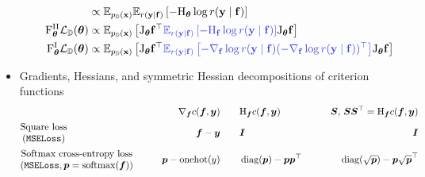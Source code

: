\begin{itemize}
\begin{itemize}
\begin{align*}
      &\propto
        \E_{p_{\sD}(\rvx)}
        \E_{r(\rvy \mid \rvf)}
        \left[
        -\hess_{\vtheta} \log r(\rvy \mid \rvf)
        \right]
      \\
      \fisher^{\text{II}}_{\vtheta} \gL_{\sD}(\vtheta)
      &\propto
        \E_{p_{\sD}(\rvx)}
        \left[
        \jac_{\vtheta} \rvf^{\top}
        \textcolor{VectorBlue}{
        \E_{r(\rvy \mid \rvf)}
        \left[
        -\hess_{\rvf} \log r(\rvy \mid \rvf)
        \right]
        }
        \jac_{\vtheta} \rvf
        \right]
      \\
      \fisher^{\text{I}}_{\vtheta} \gL_{\sD}(\vtheta)
      &\propto
        \E_{p_{\sD}(\rvx)}
        \left[
        \jac_{\vtheta} \rvf^{\top}
        \textcolor{VectorBlue}{
        \E_{r(\rvy \mid \rvf)}
        \left[
        -\nabla_{\rvf} \log r(\rvy \mid \rvf)
        (
        -\nabla_{\rvf} \log r(\rvy \mid \rvf)
        )^{\top}
        \right]
        }
        \jac_{\vtheta} \rvf
        \right]
    \end{align*}
  \end{itemize}
\item Gradients, Hessians, and symmetric Hessian decompositions of criterion functions
  \begin{align*}
    &
      \qquad&\nabla_{{\bm{f}}} c({\bm{f}}, {\bm{y}})
              \qquad&\mathrm{H}_{{\bm{f}}} c({\bm{f}}, {\bm{y}})
                      \qquad&{\bm{S}},\, {\bm{S}} {\bm{S}}^{\top} = \mathrm{H}_{{\bm{f}}} c({\bm{f}}, {\bm{y}})
    \\
    &
      \begin{matrix}
        \text{Square loss}\\
        \text{(\texttt{MSELoss})}
      \end{matrix}
    & {\bm{f}} - {\bm{y}}
      \qquad& {\bm{I}}
              \qquad& {\bm{I}}
    \\
    &
      \begin{matrix}
        \text{Softmax cross-entropy loss}\\
        (\text{\texttt{MSELoss}}, {\bm{p}} = \mathrm{softmax}({\bm{f}}))
      \end{matrix}
    \qquad& {\bm{p}} - \mathrm{onehot}(y)
    \qquad& \operatorname{diag}({\bm{p}}) - {\bm{p}} {\bm{p}}^{\top}
    \qquad& \operatorname{diag}(\sqrt{{\bm{p}}}) - {\bm{p}} \sqrt{{\bm{p}}}^{\top}
  \end{align*}
\end{itemize}
